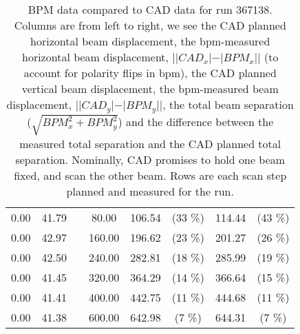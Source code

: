 \begin{table}
\begin{tabular}{c c c c c c c c}
0.00 & 41.79 &  & 80.00 & 106.54 &  (33 \%) & 114.44 &  (43 \%)\\
0.00 & 42.97 &  & 160.00 & 196.62 &  (23 \%) & 201.27 &  (26 \%)\\
0.00 & 42.50 &  & 240.00 & 282.81 &  (18 \%) & 285.99 &  (19 \%)\\
0.00 & 41.45 &  & 320.00 & 364.29 &  (14 \%) & 366.64 &  (15 \%)\\
0.00 & 41.41 &  & 400.00 & 442.75 &  (11 \%) & 444.68 &  (11 \%)\\
0.00 & 41.38 &  & 600.00 & 642.98 &  (7 \%) & 644.31 &  (7 \%)\\
\bottomrule
\end{tabular}
\caption{ BPM data compared to CAD data for run 367138. Columns are from left to right, we see the CAD planned horizontal beam displacement, the bpm-measured horizontal beam displacement, $||CAD_{x}| - |BPM_{x}||$ (to account for polarity flips in bpm), the CAD planned vertical beam displacement, the bpm-measured beam displacement, $||CAD_{y}| - |BPM_{y}||$, the total beam separation ($\sqrt{BPM_{x}^2+BPM_{y}^2}$) and the difference between the measured total separation and the CAD planned total separation. Nominally, CAD promises to hold one beam fixed, and scan the other beam. Rows are each scan step planned and measured for the run. }
\label{0xff9f47dc}
\end{table}
